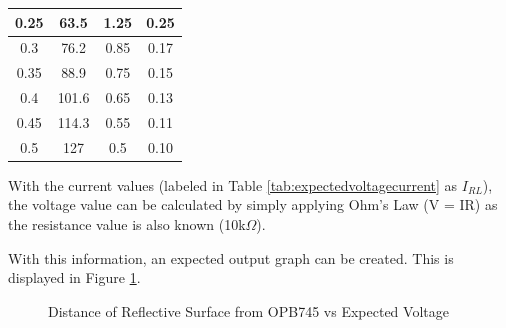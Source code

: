 \documentclass[conference]{IEEEtran}
\begin{document}
\begin{table}[H]
\begin{tabular}{|cc|cc|}
    \multicolumn{1}{|c|}{0.25}                   & 63.5                   & \multicolumn{1}{c|}{1.25}                   & 0.25                                                             \\ \hline
    \multicolumn{1}{|c|}{0.3}                    & 76.2                   & \multicolumn{1}{c|}{0.85}                   & 0.17                                                             \\ \hline
    \multicolumn{1}{|c|}{0.35}                   & 88.9                   & \multicolumn{1}{c|}{0.75}                   & 0.15                                                             \\ \hline
    \multicolumn{1}{|c|}{0.4}                    & 101.6                  & \multicolumn{1}{c|}{0.65}                   & 0.13                                                             \\ \hline
    \multicolumn{1}{|c|}{0.45}                   & 114.3                  & \multicolumn{1}{c|}{0.55}                   & 0.11                                                             \\ \hline
    \multicolumn{1}{|c|}{0.5}                    & 127                    & \multicolumn{1}{c|}{0.5}                    & 0.10                                                             \\ \hline
    \end{tabular}
\end{table}


With the current values (labeled in Table \ref{tab:expectedvoltagecurrent} as $I_{RL}$), the voltage value can be calculated by simply applying Ohm's Law (V = IR) as the resistance value is also known (10k$\Omega$).

With this information, an expected output graph can be created. This is displayed in Figure \ref{fig:expectedvoltage}.
\begin{figure}[htbp]
    \caption{Distance of Reflective Surface from OPB745 vs Expected Voltage}
    \label{fig:expectedvoltage}
\end{figure}
\end{document}
